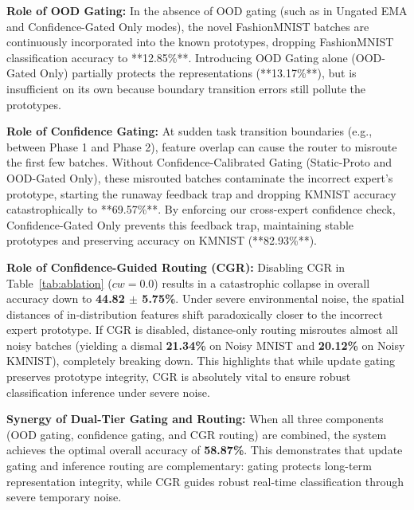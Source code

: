 \documentclass{article}
\theoremstyle{plain}
\theoremstyle{definition}
\theoremstyle{remark}
\begin{document}
\textbf{Role of OOD Gating:} In the absence of OOD gating (such as in Ungated EMA and Confidence-Gated Only modes), the novel FashionMNIST batches are continuously incorporated into the known prototypes, dropping FashionMNIST classification accuracy to **12.85\%**. Introducing OOD Gating alone (OOD-Gated Only) partially protects the representations (**13.17\%**), but is insufficient on its own because boundary transition errors still pollute the prototypes.

\textbf{Role of Confidence Gating:} At sudden task transition boundaries (e.g., between Phase 1 and Phase 2), feature overlap can cause the router to misroute the first few batches. Without Confidence-Calibrated Gating (Static-Proto and OOD-Gated Only), these misrouted batches contaminate the incorrect expert's prototype, starting the runaway feedback trap and dropping KMNIST accuracy catastrophically to **69.57\%**. By enforcing our cross-expert confidence check, Confidence-Gated Only prevents this feedback trap, maintaining stable prototypes and preserving accuracy on KMNIST (**82.93\%**).

\textbf{Role of Confidence-Guided Routing (CGR):} Disabling CGR in Table~\ref{tab:ablation} ($cw=0.0$) results in a catastrophic collapse in overall accuracy down to \textbf{44.82 $\pm$ 5.75\%}. Under severe environmental noise, the spatial distances of in-distribution features shift paradoxically closer to the incorrect expert prototype. If CGR is disabled, distance-only routing misroutes almost all noisy batches (yielding a dismal \textbf{21.34\%} on Noisy MNIST and \textbf{20.12\%} on Noisy KMNIST), completely breaking down. This highlights that while update gating preserves prototype integrity, CGR is absolutely vital to ensure robust classification inference under severe noise.

\textbf{Synergy of Dual-Tier Gating and Routing:} When all three components (OOD gating, confidence gating, and CGR routing) are combined, the system achieves the optimal overall accuracy of \textbf{58.87\%}. This demonstrates that update gating and inference routing are complementary: gating protects long-term representation integrity, while CGR guides robust real-time classification through severe temporary noise.
\end{document}
